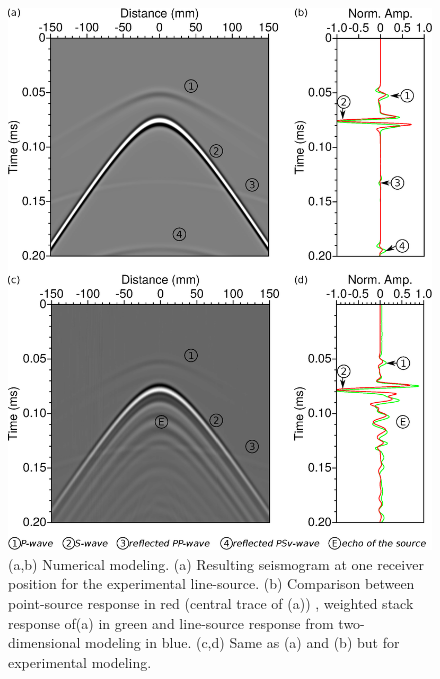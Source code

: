 \documentclass[manuscript,revised]{geophysics}
\newcommand{\twod}{two-dimensional }
\begin{document}
\begin{figure}[!h]
	\centering
	\includegraphics[scale=0.5]{fig/amplitude_stack_principle.eps}
	\caption{(a,b) Numerical modeling. (a) Resulting seismogram at one receiver position for the experimental line-source. (b) Comparison between point-source response in red (central trace of (a)) , weighted stack response of(a) in green and line-source response from \twod modeling in blue. (c,d) Same as (a) and (b) but for experimental modeling.}
	\label{amplitude_stack_principle}
\end{figure}
\end{document}
